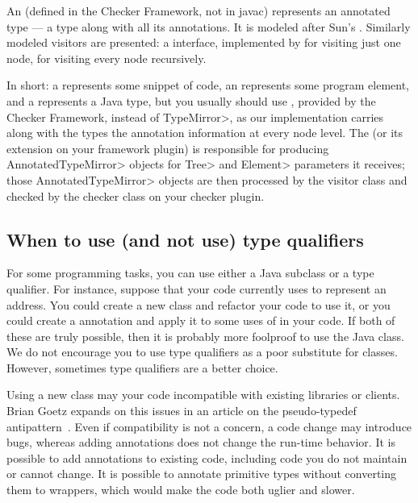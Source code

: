 An 
(defined in the Checker Framework, not in javac) represents an
annotated type --- a type along with all its annotations.  It is
modeled after Sun's
.
Similarly modeled visitors are presented: a
 interface, implemented by
for visiting just one node,
for visiting every node recursively.

In short: a
represents some snippet of code, an
represents some program element, and a
represents a Java type, but you usually should use
,
provided by the Checker Framework, instead of \<TypeMirror>, as our
implementation carries along with the types the annotation information
at every node level.  The
(or its extension on your framework plugin) is responsible for
producing \<AnnotatedTypeMirror> objects for \<Tree> and \<Element>
parameters it receives; those \<AnnotatedTypeMirror> objects are then
processed by the visitor class and checked by the checker class on
your checker plugin.


\subsection{When to use (and not use) type qualifiers\label{when-to-use-type-qualifiers}}

For some programming tasks, you can use either a Java subclass or a type
qualifier.  For instance, suppose that your code currently uses
 to represent an address.  You could create a new 
class and refactor your code to use it, or you could create a
 annotation and apply it to some uses of  in
your code.  If both of these are truly possible, then it is probably more
foolproof to use the Java class.  We do not encourage you to use type
qualifiers as a poor substitute for classes.  However, sometimes type
qualifiers are a better choice.

Using a new class may your code incompatible with existing libraries or
clients.  Brian Goetz expands on this issues in an article on the
pseudo-typedef antipattern~\cite{Goetz2006:typedef}.  Even if compatibility
is not a concern, a code change may introduce bugs, whereas adding
annotations does not change the run-time behavior.  It is possible to add
annotations to existing code, including code you do not maintain or cannot
change.  It is possible to annotate primitive types without converting them
to wrappers, which would make the code both uglier and slower.

